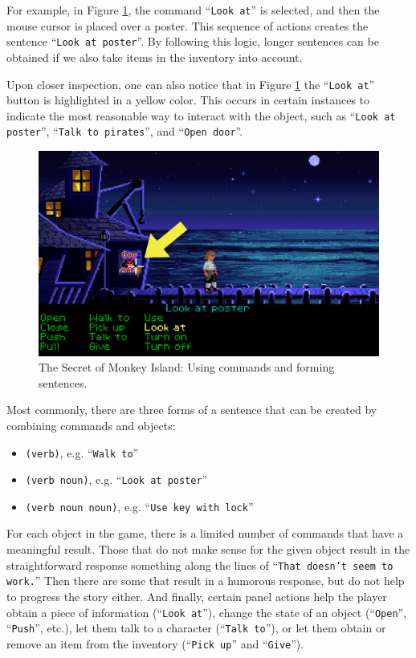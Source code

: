 For example, in Figure \ref{fig:C-TSoMI}, the command “\texttt{Look at}” is selected, and then the mouse cursor is placed over a poster. This sequence of actions creates the sentence “\texttt{Look at poster}”. By following this logic, longer sentences can be obtained if we also take items in the inventory into account. 

Upon closer inspection, one can also notice that in Figure \ref{fig:C-TSoMI} the “\texttt{Look at}” button is highlighted in a yellow color. This occurs in certain instances to indicate the most reasonable way to interact with the object, such as “\texttt{Look at poster}”, “\texttt{Talk to pirates}”, and “\texttt{Open door}”.
\begin{figure}[H]
\centering
\includegraphics[width=.8\linewidth]{img/C-TSoMI.png}
\caption{The Secret of Monkey Island: Using commands and forming sentences.}
\label{fig:C-TSoMI}
\end{figure}

Most commonly, there are three forms of a sentence that can be created by combining commands and objects:
\begin{itemize}
    \item \verb|(verb)|, e.g. “\texttt{Walk to}”
    \item \verb|(verb noun)|, e.g. “\texttt{Look at poster}”
    \item \verb|(verb noun noun)|, e.g. “\texttt{Use key with lock}”
\end{itemize}
 
For each object in the game, there is a limited number of commands that have a meaningful result. Those that do not make sense for the given object result in the straightforward response something along the lines of “\texttt{That doesn't seem to work.}”  Then there are some that result in a humorous response, but do not help to progress the story either. And finally, certain panel actions help the player obtain a piece of information (“\texttt{Look at}”), change the state of an object (“\texttt{Open}”, “\texttt{Push}”, etc.), let them talk to a character (“\texttt{Talk to}”), or let them obtain or remove an item from the inventory (“\texttt{Pick up}” and “\texttt{Give}”).

